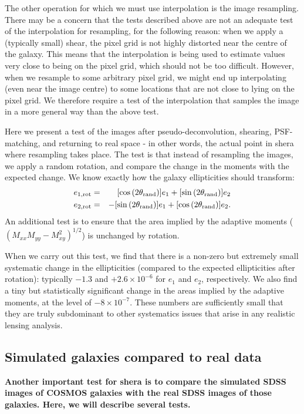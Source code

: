 \documentclass[twocolumn,useAMS,usenatbib]{mn2e}
\newcommand{\beqa}{\begin{eqnarray}}
\newcommand{\eeqa}{\end{eqnarray}}
\newcommand{\reftext}[1]{\textbf{#1}}
\begin{document}
The other operation for which we must use interpolation is the image
resampling.  There may be a concern that the tests described above are not an adequate test of the interpolation for resampling, for
the following reason: when we apply a (typically small) shear, the
pixel grid is not highly distorted near the centre of the galaxy.
This means that the interpolation is being used to estimate values
very close to being on the pixel grid, which should not be too
difficult.  However, when we resample to some arbitrary pixel grid, we
might end up interpolating (even near the image centre) to some
locations that are not close to lying on the pixel grid.
We therefore require a test of the interpolation that samples the
image in a more general way than the above test.

Here we present a test of the images after
pseudo-deconvolution, shearing, PSF-matching, and returning to real
space - in other words, the actual point in {\sc shera} where
resampling takes place.  The test is that instead of resampling the
images, we apply a random rotation, and compare the change in the
moments with the expected change.  We know exactly how the galaxy
ellipticities should transform:
\beqa
e_{1,\mathrm{rot}} &=& [\cos{(2\theta_\mathrm{rand})}] e_1 +
[\sin{(2\theta_\mathrm{rand})}] e_2 \\ \notag
e_{2,\mathrm{rot}} &=& -[\sin{(2\theta_\mathrm{rand})}] e_1 +
[\cos{(2\theta_\mathrm{rand})}] e_2.
\eeqa
An additional test is to ensure that the area implied by the adaptive
moments ($(M_{xx}M_{yy}-M_{xy}^2)^{1/2}$) is unchanged by rotation.  

When we carry out this test, we find that there is a non-zero but
extremely small systematic change in the ellipticities (compared to
the expected ellipticities after rotation): typically $-1.3$ and $+2.6\times
10^{-6}$ for $e_1$ and $e_2$, respectively.  We also find a tiny but
statistically significant change in the areas implied by the adaptive
moments, at the level of $-8\times 10^{-7}$.  These numbers are
sufficiently small that they are truly subdominant to other
systematics issues
that arise in any realistic lensing analysis.

\subsection{Simulated galaxies compared to real data}\label{SS:validation}

\reftext{Another important test for {\sc shera} is to compare the simulated SDSS
images of COSMOS galaxies with the real SDSS images of those
galaxies.   Here, we will describe several tests.}
\end{document}
